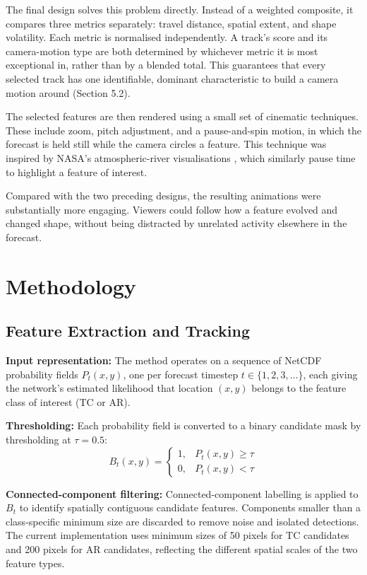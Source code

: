 \documentclass[journal abbreviation, manuscript]{copernicus}
\begin{document}
The final design solves this problem directly. Instead of a weighted
composite, it compares three metrics separately: travel distance,
spatial extent, and shape volatility. Each metric is normalised
independently. A track's score and its camera-motion type are both
determined by whichever metric it is most exceptional in, rather than
by a blended total. This guarantees that every selected track has one
identifiable, dominant characteristic to build a camera motion around
(Section 5.2).

The selected features are then rendered using a small set of cinematic
techniques. These include zoom, pitch adjustment, and a pause-and-spin
motion, in which the forecast is held still while the camera circles a
feature. This technique was inspired by NASA's atmospheric-river
visualisations \citep{nasa-climate}, which similarly pause time to
highlight a feature of interest.

Compared with the two preceding designs, the resulting animations were
substantially more engaging. Viewers could follow how a feature evolved
and changed shape, without being distracted by unrelated activity
elsewhere in the forecast. 

\section{Methodology}

\subsection{Feature Extraction and Tracking}

\textbf{Input representation:} The method operates on a sequence of NetCDF probability fields $P_t(x,y)$, one per forecast timestep $t \in \{1,2,3,\dots\}$, each giving the network's estimated likelihood that location $(x,y)$ belongs to the feature class of interest (TC or AR).

\textbf{Thresholding:} Each probability field is converted to a binary candidate mask by thresholding at $\tau = 0.5$:
\begin{equation}
B_t(x,y) =
\begin{cases}
1, & P_t(x,y) \geq \tau \\
0, & P_t(x,y) < \tau
\end{cases}
\tag{1}
\end{equation}

\textbf{Connected-component filtering:} Connected-component labelling is applied to $B_t$ to identify spatially contiguous candidate features. Components smaller than a class-specific minimum size are discarded to remove noise and isolated detections. The current implementation uses minimum sizes of 50 pixels for TC candidates and 200 pixels for AR candidates, reflecting the different spatial scales of the two feature types.
\end{document}
